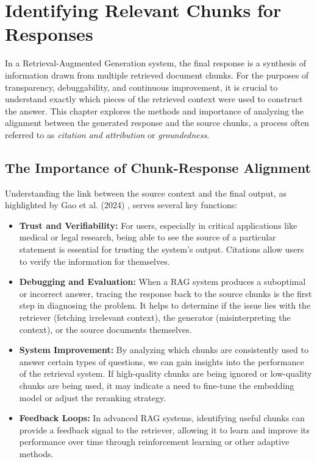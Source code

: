 \chapter{Identifying Relevant Chunks for Responses}
\label{chap:relevant_chunks}

In a Retrieval-Augmented Generation system, the final response is a synthesis of information drawn from multiple retrieved document chunks. For the purposes of transparency, debuggability, and continuous improvement, it is crucial to understand exactly which pieces of the retrieved context were used to construct the answer. This chapter explores the methods and importance of analyzing the alignment between the generated response and the source chunks, a process often referred to as \textit{citation and attribution} or \textit{groundedness}.

\section{The Importance of Chunk-Response Alignment}
Understanding the link between the source context and the final output, as highlighted by Gao et al. (2024) \autocite{gao2024retrievalaugmented}, serves several key functions:
\begin{itemize}
    \item \textbf{Trust and Verifiability:} For users, especially in critical applications like medical or legal research, being able to see the source of a particular statement is essential for trusting the system's output. Citations allow users to verify the information for themselves.
    \item \textbf{Debugging and Evaluation:} When a RAG system produces a suboptimal or incorrect answer, tracing the response back to the source chunks is the first step in diagnosing the problem. It helps to determine if the issue lies with the retriever (fetching irrelevant context), the generator (misinterpreting the context), or the source documents themselves.
    \item \textbf{System Improvement:} By analyzing which chunks are consistently used to answer certain types of questions, we can gain insights into the performance of the retrieval system. If high-quality chunks are being ignored or low-quality chunks are being used, it may indicate a need to fine-tune the embedding model or adjust the reranking strategy.
    \item \textbf{Feedback Loops:} In advanced RAG systems, identifying useful chunks can provide a feedback signal to the retriever, allowing it to learn and improve its performance over time through reinforcement learning or other adaptive methods.
\end{itemize}

